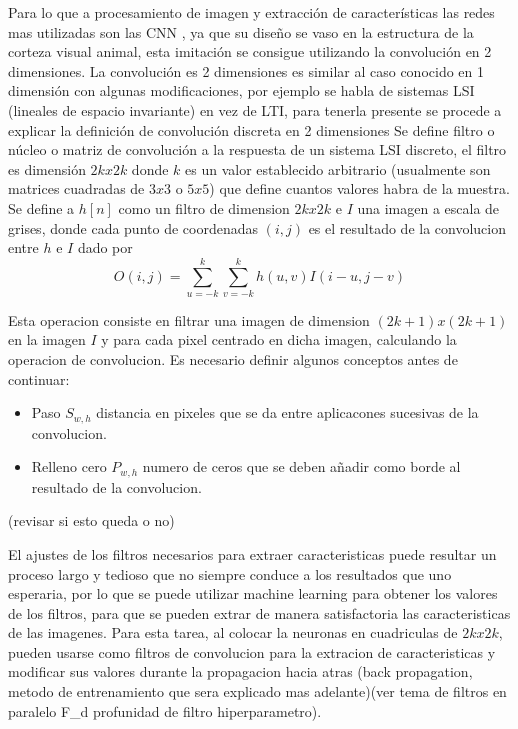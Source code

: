 Para lo que a procesamiento de imagen y extracción de características las redes mas utilizadas son las CNN , ya que su diseño se vaso en la estructura de la corteza visual animal, esta imitación se consigue utilizando la convolución en 2 dimensiones.
La convolución es 2 dimensiones es similar al caso conocido en  1 dimensión con algunas modificaciones, por ejemplo se habla de sistemas LSI (lineales de espacio invariante) en vez de LTI, para tenerla presente se procede a explicar la definición de convolución discreta en 2 dimensiones
Se define filtro o núcleo  o matriz de convolución a la respuesta de un sistema LSI discreto, el filtro es dimensión $2k x 2k$ donde $k$ es un valor establecido arbitrario (usualmente son matrices cuadradas de $3x3$ o $5x5$) que define cuantos valores habra de la muestra.
Se define a $h[n]$ como un filtro de dimension $2k x 2k$ e $I$ una imagen a escala de grises, donde cada punto de coordenadas $(i,j)$ es el resultado de la convolucion entre $h$ e $I$ dado por 
\begin{equation}
O(i,j)= \sum_{u=-k}^{k} \sum_{v=-k}^{k} h(u,v)I(i-u,j-v)
\end{equation}
 
Esta operacion consiste en filtrar una imagen de dimension $(2k+1)x(2k+1)$ en la imagen $I$ y para cada pixel centrado en dicha imagen, calculando la operacion de convolucion.
Es necesario definir algunos conceptos antes de continuar:
\begin{itemize}
\item Paso $S_{w,h}$ distancia en pixeles que se da entre aplicacones sucesivas de la convolucion.
\item Relleno cero $P_{w,h}$ numero de ceros que se deben añadir como borde al resultado de la convolucion.
\end{itemize} 
(revisar si esto queda o no)

El ajustes de los filtros necesarios para extraer caracteristicas puede resultar un proceso largo y tedioso que no siempre conduce a los resultados que uno esperaria, por lo que se puede utilizar machine learning para obtener los valores de los filtros, para que se pueden extrar de manera satisfactoria las caracteristicas de las imagenes.
Para esta tarea, al colocar la neuronas en cuadriculas de $2k x 2k$, pueden usarse como filtros de convolucion para la extracion de caracteristicas y modificar sus valores durante la propagacion hacia atras (back propagation, metodo de entrenamiento que sera explicado mas adelante)(ver tema de filtros en paralelo F_d profunidad de filtro hiperparametro).

